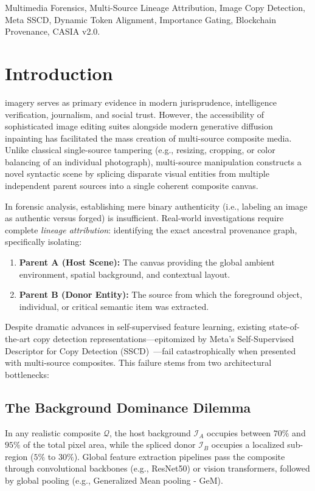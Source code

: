 \documentclass[journal]{IEEEtran}
\begin{document}
\begin{IEEEkeywords}
Multimedia Forensics, Multi-Source Lineage Attribution, Image Copy Detection, Meta SSCD, Dynamic Token Alignment, Importance Gating, Blockchain Provenance, CASIA v2.0.
\end{IEEEkeywords}

\section{Introduction}
 imagery serves as primary evidence in modern jurisprudence, intelligence verification, journalism, and social trust. However, the accessibility of sophisticated image editing suites alongside modern generative diffusion inpainting has facilitated the mass creation of multi-source composite media. Unlike classical single-source tampering (e.g., resizing, cropping, or color balancing of an individual photograph), multi-source manipulation constructs a novel syntactic scene by splicing disparate visual entities from multiple independent parent sources into a single coherent composite canvas.

In forensic analysis, establishing mere binary authenticity (i.e., labeling an image as authentic versus forged) is insufficient. Real-world investigations require complete \textit{lineage attribution}: identifying the exact ancestral provenance graph, specifically isolating:
\begin{enumerate}
    \item \textbf{Parent A (Host Scene):} The canvas providing the global ambient environment, spatial background, and contextual layout.
    \item \textbf{Parent B (Donor Entity):} The source from which the foreground object, individual, or critical semantic item was extracted.
\end{enumerate}

Despite dramatic advances in self-supervised feature learning, existing state-of-the-art copy detection representations---epitomized by Meta's Self-Supervised Descriptor for Copy Detection (SSCD)~\cite{Pizzi2022SSCD}---fail catastrophically when presented with multi-source composites. This failure stems from two architectural bottlenecks:

\subsection{The Background Dominance Dilemma}
In any realistic composite $\mathcal{Q}$, the host background $\mathcal{I}_A$ occupies between $70\%$ and $95\%$ of the total pixel area, while the spliced donor $\mathcal{I}_B$ occupies a localized sub-region ($5\%$ to $30\%$). Global feature extraction pipelines pass the composite through convolutional backbones (e.g., ResNet50) or vision transformers, followed by global pooling (e.g., Generalized Mean pooling - GeM). 
\end{document}
